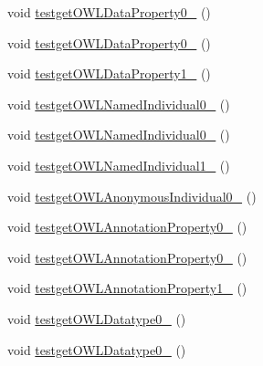 \begin{DoxyCompactItemize}
\item 
void \hyperlink{classorg_1_1semanticweb_1_1owlapi_1_1api_1_1test_1_1_null_check_test_case_a434ea3977718497910a2706456c0a0b0}{testget\-O\-W\-L\-Data\-Property0\-\_} ()
\item 
void \hyperlink{classorg_1_1semanticweb_1_1owlapi_1_1api_1_1test_1_1_null_check_test_case_a4ac1671e00f5a4210fb432327167d4c1}{testget\-O\-W\-L\-Data\-Property0\-\_} ()
\item 
void \hyperlink{classorg_1_1semanticweb_1_1owlapi_1_1api_1_1test_1_1_null_check_test_case_a13c6112f7f8a77863ce7a157b78dad7e}{testget\-O\-W\-L\-Data\-Property1\-\_} ()
\item 
void \hyperlink{classorg_1_1semanticweb_1_1owlapi_1_1api_1_1test_1_1_null_check_test_case_acb25dc2010b66c4e85ba692977d9142b}{testget\-O\-W\-L\-Named\-Individual0\-\_} ()
\item 
void \hyperlink{classorg_1_1semanticweb_1_1owlapi_1_1api_1_1test_1_1_null_check_test_case_aeedef59ae01d1608b3d9cf2909ab3a0d}{testget\-O\-W\-L\-Named\-Individual0\-\_} ()
\item 
void \hyperlink{classorg_1_1semanticweb_1_1owlapi_1_1api_1_1test_1_1_null_check_test_case_ab8c9424359cfdb38d8e6b096e304f569}{testget\-O\-W\-L\-Named\-Individual1\-\_} ()
\item 
void \hyperlink{classorg_1_1semanticweb_1_1owlapi_1_1api_1_1test_1_1_null_check_test_case_a40275fa581006356a039da4eefd24b7e}{testget\-O\-W\-L\-Anonymous\-Individual0\-\_} ()
\item 
void \hyperlink{classorg_1_1semanticweb_1_1owlapi_1_1api_1_1test_1_1_null_check_test_case_a78e864c3527033afc0b2710f00a22fcb}{testget\-O\-W\-L\-Annotation\-Property0\-\_} ()
\item 
void \hyperlink{classorg_1_1semanticweb_1_1owlapi_1_1api_1_1test_1_1_null_check_test_case_a4517ae4f9692e68a382ecc2eb86e3895}{testget\-O\-W\-L\-Annotation\-Property0\-\_} ()
\item 
void \hyperlink{classorg_1_1semanticweb_1_1owlapi_1_1api_1_1test_1_1_null_check_test_case_aade915c6cdac9266dea19572bd593c6e}{testget\-O\-W\-L\-Annotation\-Property1\-\_} ()
\item 
void \hyperlink{classorg_1_1semanticweb_1_1owlapi_1_1api_1_1test_1_1_null_check_test_case_a37856c085ae4203a71f0a3aa7dfcaa37}{testget\-O\-W\-L\-Datatype0\-\_} ()
\item 
void \hyperlink{classorg_1_1semanticweb_1_1owlapi_1_1api_1_1test_1_1_null_check_test_case_a9426152be5ef9c2aa6689dc9e4082b37}{testget\-O\-W\-L\-Datatype0\-\_} ()

\end{DoxyCompactItemize}
